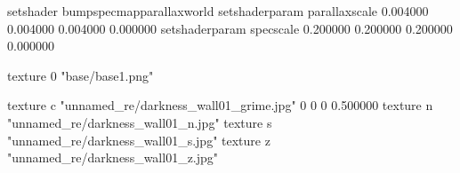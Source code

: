 setshader bumpspecmapparallaxworld
setshaderparam parallaxscale 0.004000 0.004000 0.004000 0.000000
setshaderparam specscale 0.200000 0.200000 0.200000 0.000000

texture 0 "base/base1.png"

texture c "unnamed_re/darkness_wall01_grime.jpg" 0 0 0 0.500000
texture n "unnamed_re/darkness_wall01_n.jpg"
texture s "unnamed_re/darkness_wall01_s.jpg"
texture z "unnamed_re/darkness_wall01_z.jpg"
